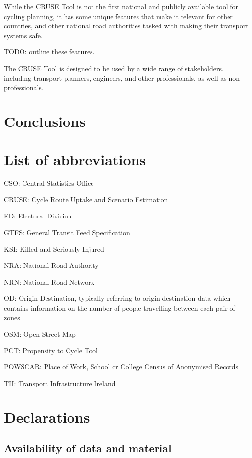 \documentclass[
  super,
  preprint,
  3p]{elsarticle}
\begin{document}
While the CRUSE Tool is not the first national and publicly available
tool for cycling planning, it has some unique features that make it
relevant for other countries, and other national road authorities tasked
with making their transport systems safe.

TODO: outline these features.

The CRUSE Tool is designed to be used by a wide range of stakeholders,
including transport planners, engineers, and other professionals, as
well as non-professionals.

\hypertarget{sec-conclusions}{%
\section{Conclusions}\label{sec-conclusions}}

\hypertarget{list-of-abbreviations}{%
\section{List of abbreviations}\label{list-of-abbreviations}}

CSO: Central Statistics Office

CRUSE: Cycle Route Uptake and Scenario Estimation

ED: Electoral Division

GTFS: General Transit Feed Specification

KSI: Killed and Seriously Injured

NRA: National Road Authority

NRN: National Road Network

OD: Origin-Destination, typically referring to origin-destination data
which contains information on the number of people travelling between
each pair of zones

OSM: Open Street Map

PCT: Propensity to Cycle Tool

POWSCAR: Place of Work, School or College Census of Anonymised Records

TII: Transport Infrastructure Ireland

\hypertarget{declarations}{%
\section{Declarations}\label{declarations}}

\hypertarget{availability-of-data-and-material}{%
\subsection*{Availability of data and
material}\label{availability-of-data-and-material}}
\end{document}
